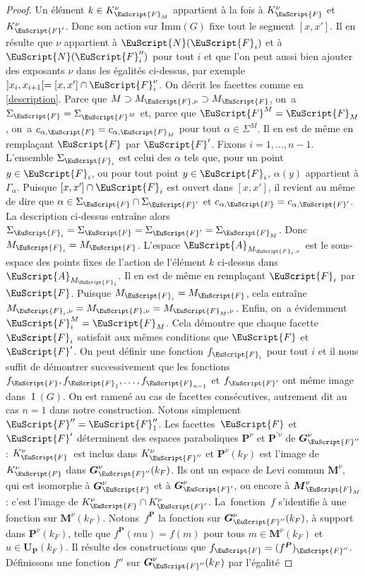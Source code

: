\documentclass[JEP,XML,SOM,Unicode,francais]{cedram}
\let\mathcal \EuScript
\newcommand{\Imm}{\mathrm{Imm}}
\DeclareMathOperator{\rI}{I}
\newcommand{\bG}{\boldsymbol{G}}
\newcommand{\bM}{\boldsymbol{M}}
\newcommand{\bP}{\boldsymbol{P}}
\newcommand{\bU}{\boldsymbol{U}}
\newcommand{\cA}{\mathcal{A}}
\newcommand{\cF}{\mathcal{F}}
\newcommand{\cN}{\mathcal{N}}
\theoremstyle{plain}
\theoremstyle{definition}
\begin{document}
\begin{proof}
Un élément $k\in K_{\cF_{M}}^{\nu}$ appartient à la fois à $K_{\cF}^{\nu}$ et $K_{\cF'}^{\nu}$. Donc son action sur $\Imm(G)$ fixe tout le segment $[x,x']$. Il en résulte que $\nu$ appartient à $\cN(\cF_{i})$ et à $\cN(\cF''_{i})$ pour tout $i$ et que l'on peut aussi bien ajouter des exposants $\nu$ dans les égalités ci-dessus, par exemple $]x_{i},x_{i+1}[=[x,x']\cap \cF_{i}^{\nu}$. On décrit les facettes comme en \ref{description}. Parce que $M\supset M_{\cF,\nu}\supset M_{\cF}$, on~a $\Sigma_{\cF}=\Sigma_{\cF^{M}}$ et, parce que $\cF^M=\cF_{M}$, on~a $c_{\alpha,\cF}=c_{\alpha,\cF_{M}}$ pour tout $\alpha\in \Sigma^M$. Il en est de même en remplaçant $\cF$ par $\cF'$. Fixons $i=1,\dots,n-1$. L'ensemble $\Sigma_{\cF_{i}}$ est celui des $\alpha$ tels que, pour un point $y\in \cF_{i}$, ou pour tout point $y\in \cF_{i}$, $\alpha(y)$ appartient à $\Gamma_{\alpha}$. Puisque $[x,x']\cap \cF_{i}$ est ouvert dans $[x,x']$, il revient au même de dire que $\alpha\in \Sigma_{\cF}\cap \Sigma_{\cF'}$ et $c_{\alpha,\cF}=c_{\alpha,\cF'}$. La description ci-dessus entraîne alors $\Sigma_{\cF_{i}}=\Sigma_{\cF}=\Sigma_{\cF'}=\Sigma_{\cF_{M}}$. Donc $M_{\cF_{i}}=M_{\cF}$. L'espace $\cA_{M_{\cF_{i},\nu}}$ est le sous-espace des points fixes de l'action de l'élément $k$ ci-dessus dans $\cA_{M_{\cF_{i}}}$. Il en est de même en remplaçant $\cF_{i}$ par $\cF$. Puisque $M_{\cF_{i}}=M_{\cF}$, cela entraîne $M_{\cF_{i},\nu}=M_{\cF,\nu}=M_{\cF_{M},\nu}$. Enfin, on~a évidemment $\cF_{i}^M=\cF_{M}$. Cela démontre que chaque facette $\cF_{i}$ satisfait aux mêmes conditions que $\cF$ et $\cF'$. On peut définir une fonction $f_{\cF_{i}}$ pour tout $i$ et il nous suffit de démontrer successivement que les fonctions $f_{\cF}, f_{\cF_{1}},\dots,f_{\cF_{n-1}}$ et $f_{\cF'}$ ont même image dans $\rI(G)$. On est ramené au cas de facettes consécutives, autrement dit au cas $n=1$ dans notre construction. Notons simplement $\cF''=\cF''_{1}$. Les facettes~$\cF$ et~$\cF'$ déterminent des espaces paraboliques $\bP^{\nu}$ et $\bP^{\prime\nu}$ de $\bG_{\cF''}^{\nu}$: $K_{\cF}^{\nu}$~est inclus dans $ K_{\cF''}^{\nu}$ et $\bP^{\nu}(k_{F})$ est l'image de $K_{\cF}^{\nu}$ dans $\bG_{\cF''}^{\nu}(k_{F})$. Ils ont un espace de Levi commun $\bM^{\nu}$, qui est isomorphe à $\bG_{\cF}^{\nu}$ et à $\bG_{\cF'}^{\nu}$, ou encore à $\bM_{\cF_{M}}^{\nu}$: c'est l'image de $K_{\cF}^{\nu}\cap K_{\cF'}^{\nu}$. La~fonction~$f$ s'identifie à une fonction sur $\bM^{\nu}(k_{F})$. Notons~$f^{\bP}$ la fonction sur $\bG_{\cF''}^{\nu}(k_{F})$, à support dans $\bP^{\nu}(k_{F})$, telle que $f^{\bP}(mu)=f(m)$ pour tous $m\in \bM^{\nu}(k_{F})$ et $u\in \bU_{\bP}(k_{F})$. Il résulte des constructions que $f_{\cF}=(f^{\bP})_{\cF''}$. Définissons une fonction $f''$ sur $\bG^{\nu}_{\cF''}(k_{F})$ par l'égalité

\end{proof}
\end{document}
